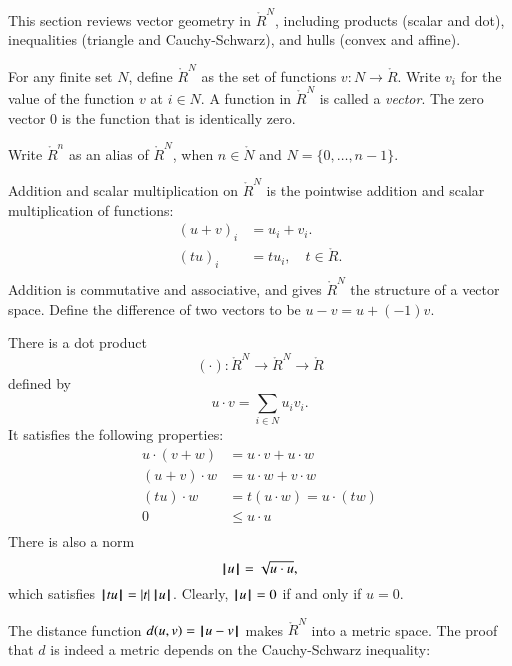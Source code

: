 This section reviews vector geometry in $\ring{R}^N$, including products (scalar and dot), inequalities (triangle and Cauchy-Schwarz), and hulls (convex and affine).

\begin{definition}
For any finite set $N$, define $\ring{R}^N$ as the set of functions
$v:N\to\ring{R}$. Write $v_i$ for the value of the function $v$ at $i\in N$.
%
%
A function in $\ring{R}^N$ is called a {\it vector}.  
The zero vector $0$ is the function that is identically zero.  
%
\end{definition}
Write $\ring{R}^n$ as an alias of $\ring{R}^N$, 
when $n\in\ring{N}$ and $N=\{0,\ldots,n-1\}$.

Addition and scalar multiplication on $\ring{R}^N$
is the pointwise addition and scalar multiplication of functions:
    $$\begin{array}{rll}
    (u + v)_i &= u_i + v_i.\\
    (t u)_i &= t u_i,\quad t\in\ring{R}.\\
    \end{array}
    $$
%
%
Addition is commutative and associative, and gives
$\ring{R}^N$ the structure of a vector space.
Define the difference of two vectors to be $u - v = u + (-1) v$.
%

There is a dot product
$$(\cdot):\ring{R}^N\to\ring{R}^N\to\ring{R}$$ defined by
    $$u\cdot v = \sum_{i\in N} u_i v_i.$$
%
%
It satisfies the following
properties:
    $$\begin{array}{rll}
        u \cdot (v + w) &= u \cdot v + u \cdot w\\
        (u + v)\cdot w &= u \cdot w + v \cdot w\\
        (t u)\cdot w &= t(u \cdot w) = u \cdot (t w)\\
        0 &\le u\cdot u\\
    \end{array}$$
There is also a norm
$${{\hskip0.1em|\hskip-0.15em|\hskip0.1em}u{\hskip0.1em|\hskip-0.15em|\hskip0.1em}} = \sqrt{u\cdot u},$$
which satisfies ${{\hskip0.1em|\hskip-0.15em|\hskip0.1em} t u {\hskip0.1em|\hskip-0.15em|\hskip0.1em}} = |t| \, {{\hskip0.1em|\hskip-0.15em|\hskip0.1em}u{\hskip0.1em|\hskip-0.15em|\hskip0.1em}}$.  Clearly, ${{\hskip0.1em|\hskip-0.15em|\hskip0.1em}u{\hskip0.1em|\hskip-0.15em|\hskip0.1em}}=0$  if and only if $u=0$.
%

The distance function $d(u,v) = {\hskip0.1em|\hskip-0.15em|\hskip0.1em} u  -  v{\hskip0.1em|\hskip-0.15em|\hskip0.1em}$ makes
$\ring{R}^N$ into a metric space.  
%
%
%
The proof that $d$ is indeed a metric depends on the Cauchy-Schwarz inequality:


